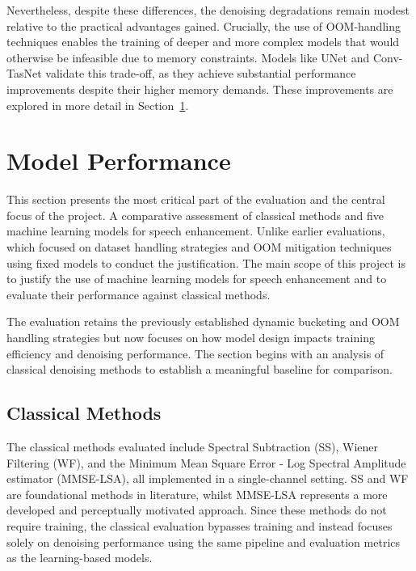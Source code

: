 Nevertheless, despite these differences, the denoising degradations remain modest relative to the practical advantages gained. Crucially, the use of OOM-handling techniques enables the training of deeper and more complex models that would otherwise be infeasible due to memory constraints. Models like UNet and Conv-TasNet validate this trade-off, as they achieve substantial performance improvements despite their higher memory demands. These improvements are explored in more detail in Section~\ref{sec:model_performance}.

\section{Model Performance}
\label{sec:model_performance}

This section presents the most critical part of the evaluation and the central focus of the project. A comparative assessment of classical methods and five machine learning models for speech enhancement. Unlike earlier evaluations, which focused on dataset handling strategies and OOM mitigation techniques using fixed models to conduct the justification. The main scope of this project is to justify the use of machine learning models for speech enhancement and to evaluate their performance against classical methods.

The evaluation retains the previously established dynamic bucketing and OOM handling strategies but now focuses on how model design impacts training efficiency and denoising performance. The section begins with an analysis of classical denoising methods to establish a meaningful baseline for comparison.

\subsection{Classical Methods}
\label{sec:classical_methods}

The classical methods evaluated include Spectral Subtraction (SS), Wiener Filtering (WF), and the Minimum Mean Square Error - Log Spectral Amplitude estimator (MMSE-LSA), all implemented in a single-channel setting. SS and WF are foundational methods in literature, whilst MMSE-LSA represents a more developed and perceptually motivated approach. Since these methods do not require training, the classical evaluation bypasses training and instead focuses solely on denoising performance using the same pipeline and evaluation metrics as the learning-based models.


